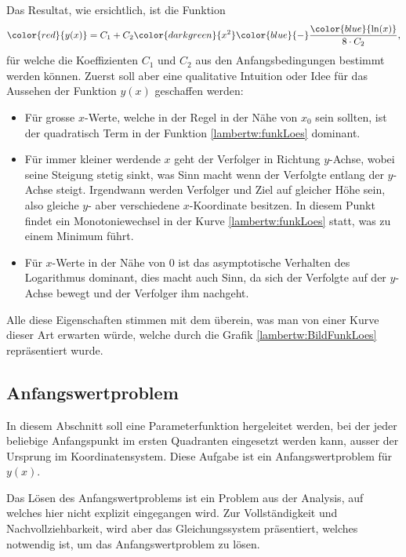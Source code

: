 Das Resultat, wie ersichtlich, ist die Funktion  
\begin{equation}
	{\color{red}{y(x)}}
	=
	C_1 + C_2 {\color{darkgreen}{x^2}} {\color{blue}{-}} \frac{\color{blue}{\operatorname{ln}(x)}}{8 \cdot C_2},
	\label{lambertw:funkLoes}
\end{equation}
für welche die Koeffizienten \(C_1\) und \(C_2\) aus den Anfangsbedingungen bestimmt werden können. Zuerst soll aber eine qualitative Intuition oder Idee für das Aussehen der Funktion \(y(x)\) geschaffen werden:
\begin{itemize}
	\item
	Für grosse \(x\)-Werte, welche in der Regel in der Nähe von \(x_0\) sein sollten, ist der quadratisch Term in der Funktion \eqref{lambertw:funkLoes} dominant. 
	\item
	Für immer kleiner werdende \(x\) geht der Verfolger in Richtung \(y\)-Achse, wobei seine Steigung stetig sinkt, was Sinn macht wenn der Verfolgte entlang der \(y\)-Achse steigt. Irgendwann werden Verfolger und Ziel auf gleicher Höhe sein, also gleiche \(y\)- aber verschiedene \(x\)-Koordinate besitzen.
	In diesem Punkt findet ein Monotoniewechsel in der Kurve \eqref{lambertw:funkLoes} statt, was zu einem Minimum führt.
	\item
	Für \(x\)-Werte in der Nähe von \(0\) ist das asymptotische Verhalten des Logarithmus dominant, dies macht auch Sinn, da sich der Verfolgte auf der \(y\)-Achse bewegt und der Verfolger ihm nachgeht.
\end{itemize}
Alle diese Eigenschaften stimmen mit dem überein, was man von einer Kurve dieser Art erwarten würde, welche durch die Grafik \ref{lambertw:BildFunkLoes} repräsentiert wurde.

\subsection{Anfangswertproblem 
	\label{lambertw:subsection:AllgLoes}}
In diesem Abschnitt soll eine Parameterfunktion hergeleitet werden, bei der jeder beliebige Anfangspunkt im ersten Quadranten eingesetzt werden kann, ausser der Ursprung im Koordinatensystem. Diese Aufgabe ist ein Anfangswertproblem für \(y(x)\).

Das Lösen des Anfangswertproblems ist ein Problem aus der Analysis, auf welches hier nicht explizit eingegangen wird. Zur Vollständigkeit und Nachvollziehbarkeit, wird aber das Gleichungssystem präsentiert, welches notwendig ist, um das Anfangswertproblem zu lösen.

